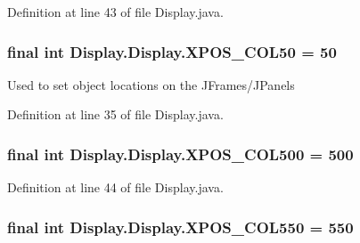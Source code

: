 Definition at line 43 of file Display.\+java.

\hypertarget{class_display_1_1_display_a044af84b350b1be71c612ab3b534e24d}{}
\subsubsection[{X\+P\+O\+S\+\_\+\+C\+O\+L50}]{\setlength{\rightskip}{0pt plus 5cm}final int Display.\+Display.\+X\+P\+O\+S\+\_\+\+C\+O\+L50 = 50\hspace{0.3cm}{\ttfamily [static]}}\label{class_display_1_1_display_a044af84b350b1be71c612ab3b534e24d}
Used to set object locations on the J\+Frames/\+J\+Panels 

Definition at line 35 of file Display.\+java.

\hypertarget{class_display_1_1_display_a8fafcc6bf1485ea9d420d3ec725472a7}{}
\subsubsection[{X\+P\+O\+S\+\_\+\+C\+O\+L500}]{\setlength{\rightskip}{0pt plus 5cm}final int Display.\+Display.\+X\+P\+O\+S\+\_\+\+C\+O\+L500 = 500\hspace{0.3cm}{\ttfamily [static]}}\label{class_display_1_1_display_a8fafcc6bf1485ea9d420d3ec725472a7}


Definition at line 44 of file Display.\+java.

\hypertarget{class_display_1_1_display_a50de34dab11aef2aa13d782d088deb7d}{}
\subsubsection[{X\+P\+O\+S\+\_\+\+C\+O\+L550}]{\setlength{\rightskip}{0pt plus 5cm}final int Display.\+Display.\+X\+P\+O\+S\+\_\+\+C\+O\+L550 = 550\hspace{0.3cm}{\ttfamily [static]}}\label{class_display_1_1_display_a50de34dab11aef2aa13d782d088deb7d}


